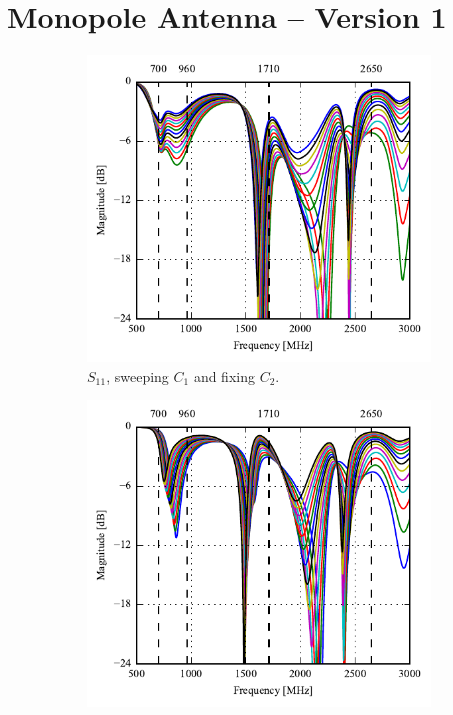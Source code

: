 \section{Monopole Antenna -- Version 1}

\begin{figure}[htbp]
   \begin{subfigure}[b]{0.49\linewidth}
        \centering
        \includegraphics{img/tech_sol/monopole/prototype_v1/s11}
        \caption{$S_{11}$, sweeping $C_1$ and fixing $C_2$.}
        \label{fig:ant1_s11}
    \end{subfigure}
    \hfill
    \begin{subfigure}[b]{0.49\linewidth}
        \centering
        \includegraphics{img/tech_sol/monopole/prototype_v1/s22}

\end{subfigure}
\end{figure}
